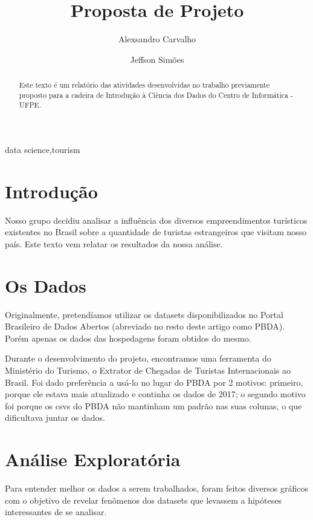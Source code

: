 \documentclass[review]{elsarticle}
\begin{document}
\begin{frontmatter}

\title{Proposta de Projeto}

\author{Alexsandro Carvalho}

\author{Jeffson Simões}

\begin{abstract}
Este texto é um relatório das atividades desenvolvidas no trabalho previamente proposto para a cadeira de Introdução à Ciência dos Dados do Centro de Informática - UFPE.
\end{abstract}

\begin{keyword}
data science\sep tourism
\end{keyword}

\end{frontmatter}

\linenumbers

\section{Introdução}
Nosso grupo decidiu analisar a influência dos diversos empreendimentos turísticos existentes no Brasil sobre a quantidade de turistas estrangeiros que visitam nosso país. Este texto vem relatar os resultados da nossa análise.

\section{Os Dados}
Originalmente, pretendíamos utilizar os datasets disponibilizados no Portal Brasileiro de Dados Abertos (abreviado no resto deste artigo como PBDA). Porém apenas os dados das hospedagens foram obtidos do mesmo.

Durante o desenvolvimento do projeto, encontramos uma ferramenta do Ministério do Turismo, o Extrator de Chegadas de Turistas Internacionais ao Brasil. Foi dado preferência a usá-lo no lugar do PBDA por 2 motivos: primeiro, porque ele estava mais atualizado e continha os dados de 2017; o segundo motivo foi porque os csvs do PBDA não mantinham um padrão nas suas colunas, o que dificultava juntar os dados.

\section{Análise Exploratória}

Para entender melhor os dados a serem trabalhados, foram feitos diversos gráficos com o objetivo de revelar fenômenos dos datasets que levassem a hipóteses interessantes de se analisar.
\end{document}
